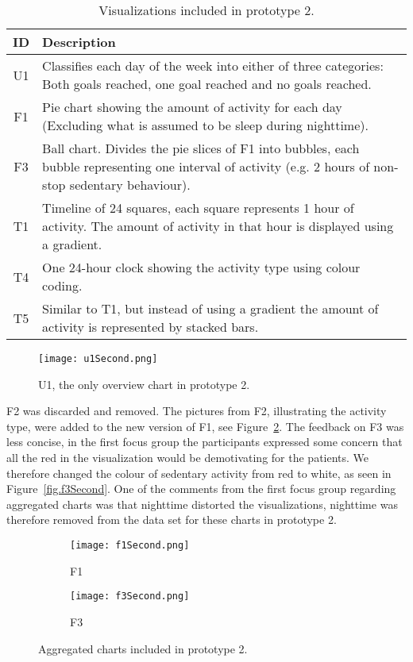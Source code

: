 \begin{table}[h!]
  \centering
  \begin{tabular}{|c|p{11cm}|}
    \hline
    \textbf{ID} & \textbf{Description} \\ \hline
    U1 & Classifies each day of the week into either of three categories: Both goals reached, one goal reached and no goals reached. \\ \hline
    F1 & Pie chart showing the amount of activity for each day (Excluding what is assumed to be sleep during nighttime). \\ \hline
    F3 & Ball chart. Divides the pie slices of F1 into bubbles, each bubble representing one interval of activity (e.g. 2 hours of non-stop sedentary behaviour). \\ \hline
    T1 & Timeline of 24 squares, each square represents 1 hour of activity. The amount of activity in that hour is displayed using a gradient. \\ \hline
    T4 & One 24-hour clock showing the activity type using colour coding. \\ \hline
    T5 & Similar to T1, but instead of using a gradient the amount of activity is represented by stacked bars. \\ \hline
  \end{tabular}
  \caption{Visualizations included in prototype 2.}
  \label{tab:runProtDesc2}
\end{table}

\begin{figure}[h!]
  \centering
  \texttt{[image: u1Second.png]}
  \caption{U1, the only overview chart in prototype 2.}
  \label{fig:uSecond}
\end{figure}

F2 was discarded and removed. The pictures from F2, illustrating the activity type, were added to the new version of F1, see Figure~\ref{fig:f1Second}. The feedback on F3 was less concise, in the first focus group the participants expressed some concern that all the red in the visualization would be demotivating for the patients. We therefore changed the colour of sedentary activity from red to white, as seen in Figure~\ref{fig.f3Second}. One of the comments from the first focus group regarding aggregated charts was that nighttime distorted the visualizations, nighttime was therefore removed from the data set for these charts in prototype 2.

\begin{figure}[h!]
  \centering
  \begin{subfigure}[b]{0.45\textwidth}
    \centering
    \texttt{[image: f1Second.png]}
    \caption{F1}
    \label{fig:f1Second}
  \end{subfigure}
  \begin{subfigure}[b]{0.45\textwidth}
    \centering
    \texttt{[image: f3Second.png]}
    \caption{F3}
    \label{fig:f3Second}
  \end{subfigure}
  \caption{Aggregated charts included in prototype 2.}
\end{figure}


